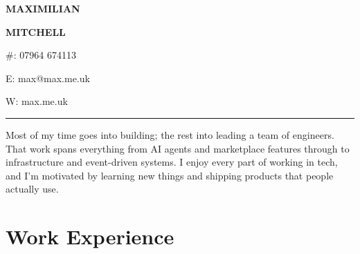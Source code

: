 \documentclass[10pt,a4paper]{extarticle}
\begin{document}
\raggedbottom\enlargethispage{2\baselineskip}

\noindent\begin{minipage}[b]{0.55\textwidth}
{\LARGE\bfseries MAXIMILIAN}\par{\LARGE\bfseries MITCHELL}
\end{minipage}\hfill
\begin{minipage}[b]{0.43\textwidth}\raggedleft\small
\#: 07964 674113\par E: max@max.me.uk\par W: max.me.uk
\end{minipage}\par\vspace{-4pt}
{\color{black}\rule{\textwidth}{1.4pt}}\par\vspace{4pt}
Most of my time goes into building; the rest into leading a team of engineers. That work spans everything from AI agents and marketplace features through to infrastructure and event-driven systems. I enjoy every part of working in tech, and I'm motivated by learning new things and shipping products that people actually use.\par

\section{Work Experience}
\end{document}
